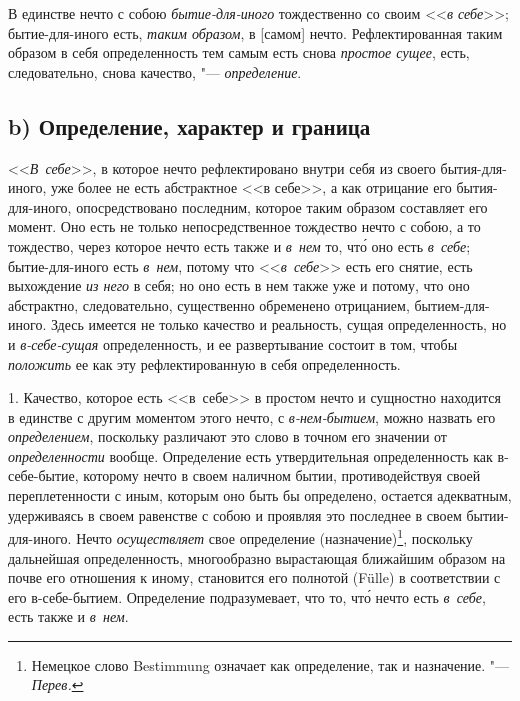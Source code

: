 В единстве нечто с собою {\em бытие-для-иного}
тождественно со своим <<{\em в себе}>>; бытие-для-иного
есть, {\em таким образом}, в [самом] нечто.
Рефлектированная таким образом в себя определенность тем самым есть снова
{\em простое сущее}, есть, следовательно, снова
качество, "--- {\em определение}.

\subsection[b) Определение, характер и граница]{b) Определение, характер и граница}
<<{\em В~себе}>>, в которое нечто рефлектировано внутри
себя из своего бытия-для-иного, уже более не есть абстрактное <<в себе>>, а
как отрицание его бытия-для-иного, опосредствовано последним, которое
таким образом составляет его момент. Оно есть не только непосредственное
тождество нечто с собою, а то тождество, через которое нечто есть также и
{\em в~нем} то, чт\'{о} оно есть {\em в~себе};
бытие-для-иного есть {\em в~нем}, потому что
<<{\em в~себе}>> есть его снятие, есть выхождение
{\em из него} в себя; но оно есть в нем также уже и
потому, что оно абстрактно, следовательно, существенно обременено
отрицанием, бытием-для-иного. Здесь имеется не только качество и
реальность, сущая определенность, но и
{\em в-себе-сущая} определенность, и ее развертывание
состоит в том, чтобы {\em положить} ее как эту
рефлектированную в себя определенность.

1. Качество, которое есть <<в~себе>>
в простом нечто и сущностно находится
в единстве с другим моментом этого нечто, с
{\em в-нем-бытием}, можно назвать его
{\em определением}, поскольку различают это слово в
точном его значении от {\em определенности} вообще.
Определение есть утвердительная определенность как в-себе-бытие, которому
нечто в своем наличном бытии, противодействуя своей переплетенности с
иным, которым оно быть бы определено, остается адекватным,
удерживаясь в своем равенстве с собою и проявляя это последнее в своем
бытии-для-иного. Нечто {\em осуществляет} свое
определение (назначение)\footnote{Немецкое слово Bestimmung
означает как определение, так и назначение. "--- {\em Перев.}},
поскольку дальнейшая определенность,
многообразно вырастающая ближайшим образом на почве его отношения к
иному, становится его полнотой (Fülle) в соответствии с его
в-себе-бытием. Определение подразумевает, что то, чт\'{о} нечто есть
{\em в~себе}, есть также и {\em в~нем}.

